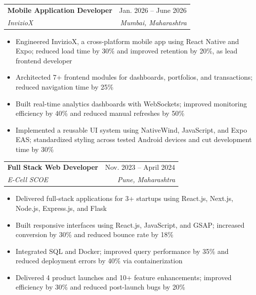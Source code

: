 \documentclass[letterpaper,11pt]{article}
\makeatletter
\newcommand{\resumeItem}[1]{
    \item\small{#1}
}
\newcommand{\resumeSubheading}[4]{
    \item
    \begin{tabular*}{0.97\textwidth}[t]{l@{\extracolsep{\fill}}r}
        \textbf{#1} & #2 \\
        \textit{\small#3} & \textit{\small#4} \\
    \end{tabular*}
}
\newcommand{\resumeSubSubheading}[2]{
    \item
    \begin{tabular*}{0.97\textwidth}{l@{\extracolsep{\fill}}r}
        \textit{\small#1} & \textit{\small#2} \\
    \end{tabular*}
}
\newcommand{\resumeSubHeadingListEnd}{
    \end{itemize}
}
\newcommand{\resumeItemListStart}{
    \begin{itemize}[
        leftmargin=0.18in,
        topsep=0pt,
        partopsep=0pt,
        parsep=0pt,
        itemsep=0pt
    ]
}
\newcommand{\resumeItemListEnd}{
    \end{itemize}
}
\makeatother
\begin{document}
    \resumeSubheading
      {Mobile Application Developer}{Jan. 2026 -- June 2026}
      {InvizioX}{Mumbai, Maharashtra}
      \resumeItemListStart
        \resumeItem{Engineered InvizioX, a cross-platform mobile app using React Native and Expo; reduced load time by 30\% and improved retention by 20\%, as lead frontend developer}
        \resumeItem{Architected 7+ frontend modules for dashboards, portfolios, and transactions; reduced navigation time by 25\%}
        \resumeItem{Built real-time analytics dashboards with WebSockets; improved monitoring efficiency by 40\% and reduced manual refreshes by 50\%}
        \resumeItem{Implemented a reusable UI system using NativeWind, JavaScript, and Expo EAS; standardized styling across tested Android devices and cut development time by 30\%}
      \resumeItemListEnd
      


    \resumeSubheading
      {Full Stack Web Developer}{Nov. 2023 -- April 2024}
      {E-Cell SCOE}{Pune, Maharashtra}
      \resumeItemListStart
        \resumeItem{Delivered full-stack applications for 3+ startups using React.js, Next.js, Node.js, Express.js, and Flask}
        \resumeItem{Built responsive interfaces using React.js, JavaScript, and GSAP; increased conversion by 30\% and reduced bounce rate by 18\%}
        \resumeItem{Integrated SQL and Docker; improved query performance by 35\% and reduced deployment errors by 40\% via containerization}
        \resumeItem{Delivered 4 product launches and 10+ feature enhancements; improved efficiency by 30\% and reduced post-launch bugs by 20\%}
      \resumeItemListEnd
\end{document}
